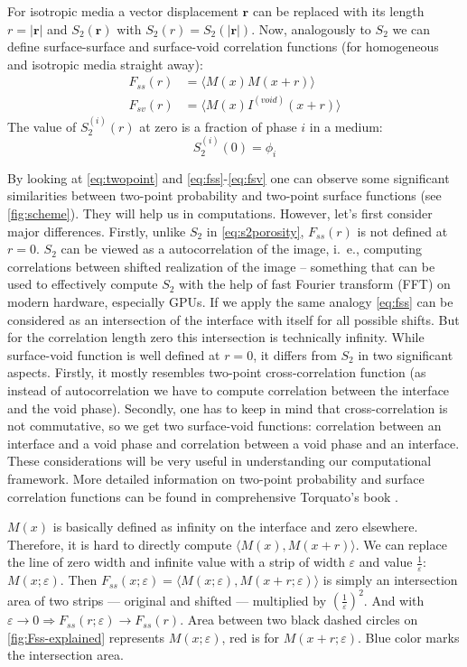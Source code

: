 \documentclass[reprint,amsmath,amssymb,aps,pre]{revtex4-1}
\begin{document}
For isotropic media a vector displacement $\mathbf{r}$ can be replaced with its
length $r = |\mathbf{r}|$ and $S_2(\mathbf{r})$ with $S_2(r) = S_2(|\mathbf{r}|)$.
Now, analogously to $S_2$ we can define surface-surface and surface-void
correlation functions (for homogeneous and isotropic media straight away):
\begin{align}
  F_{ss}(r) &= \langle M(x)M(x+r) \rangle \label{eq:fss} \\
  F_{sv}(r) &= \langle M(x)I^{(void)}(x+r) \label{eq:fsv} \rangle
\end{align}
The value of $S^{(i)}_2(r)$ at zero is a fraction of phase $i$ in a medium:
\begin{equation}
  S_2^{(i)}(0) = \phi_i \label{eq:s2porosity}
\end{equation}

By looking at \cref{eq:twopoint} and \cref{eq:fss}-\cref{eq:fsv} one can observe
some significant similarities between two-point probability and two-point
surface functions (see \cref{fig:scheme}). They will help us in
computations. However, let's first consider major differences. Firstly, unlike
$S_2$ in \cref{eq:s2porosity}, $F_{ss}(r)$ is not defined at $r=0$. $S_2$ can
be viewed as a autocorrelation of the image, i.~e., computing correlations
between shifted realization of the image -- something that can be used to
effectively compute $S_2$ with the help of fast Fourier transform (FFT) on
modern hardware, especially GPUs. If we apply the same analogy \cref{eq:fss}
can be considered as an intersection of the interface with itself for all
possible shifts. But for the correlation length zero this intersection is
technically infinity. While surface-void function is well defined at $r=0$, it
differs from $S_2$ in two significant aspects. Firstly, it mostly resembles
two-point cross-correlation function (as instead of autocorrelation we have to
compute correlation between the interface and the void phase). Secondly, one has
to keep in mind that cross-correlation is not commutative, so we get two
surface-void functions: correlation between an interface and a void phase and
correlation between a void phase and an interface. These considerations will be
very useful in understanding our computational framework. More detailed
information on two-point probability and surface correlation functions can be
found in comprehensive Torquato's book \cite{Torq_book}.

$M(x)$ is basically defined as infinity on the interface and zero elsewhere.
Therefore, it is hard to directly compute $\langle M(x), M(x + r) \rangle$.
We can replace the line of zero width and infinite value 
with a strip of width $\varepsilon$ and value $\frac{1}{\varepsilon}$: $M(x; \varepsilon)$. 
Then $F_{ss}(x; \varepsilon) = \langle M(x; \varepsilon), M(x + r; \varepsilon) \rangle$ 
is simply an intersection area of two strips 
--- original and shifted --- 
multiplied by $(\frac{1}{\varepsilon})^2$. 
And with $\varepsilon \to 0 \Rightarrow F_{ss}(r; \varepsilon) \to F_{ss}(r)$.
Area between two black dashed circles on \cref{fig:Fss-explained} 
represents $M(x; \varepsilon)$,
red is for $M(x + r; \varepsilon)$. 
Blue color marks the intersection area.
\end{document}
